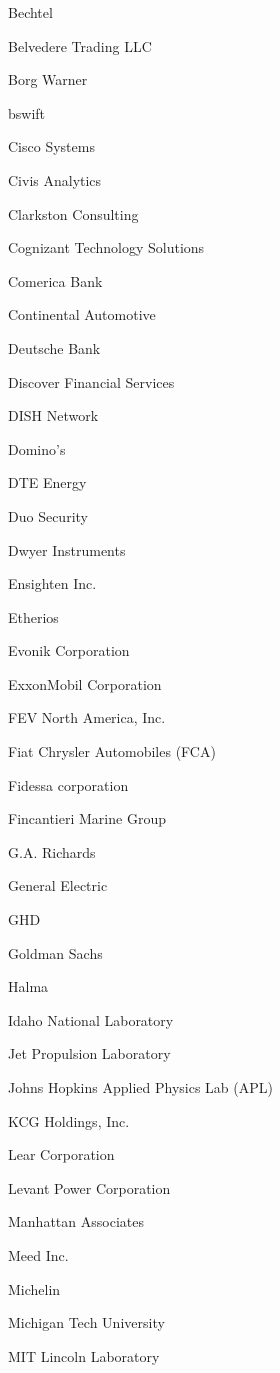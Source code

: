 \documentclass[twoside]{article}
\begin{document}
\begin{center}
\begin{multicols}{5}
\begin{FlushLeft}
\begin{compactitem}
\item Bechtel
\item Belvedere Trading LLC
\item Borg Warner
\item bswift
\item Cisco Systems
\item Civis Analytics
\item Clarkston Consulting
\item Cognizant Technology Solutions
\item Comerica Bank
\item Continental Automotive
\item Deutsche Bank
\item Discover Financial Services
\item DISH Network
\item Domino's
\item DTE Energy
\item Duo Security
\item Dwyer Instruments
\item Ensighten Inc.
\item Etherios
\item Evonik Corporation
\item ExxonMobil Corporation
\item FEV North America, Inc.
\item Fiat Chrysler Automobiles (FCA)
\item Fidessa corporation
\item Fincantieri Marine Group
\item G.A. Richards
\item General Electric
\item GHD
\item Goldman Sachs
\item Halma
\item Idaho National Laboratory
\item Jet Propulsion Laboratory
\item Johns Hopkins Applied Physics Lab (APL)
\item KCG Holdings, Inc.
\item Lear Corporation
\item Levant Power Corporation
\item Manhattan Associates
\item Meed Inc.
\item Michelin
\item Michigan Tech University
\item MIT Lincoln Laboratory

\end{compactitem}
\end{FlushLeft}
\end{multicols}
\end{center}
\end{document}
